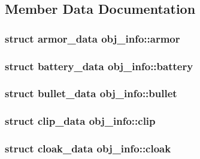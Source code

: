 \subsection{Member Data Documentation}
\hypertarget{unionobj__info_a552fc4f7734bc659341b5fd857a4aa11}{
\subsubsection[{armor}]{\setlength{\rightskip}{0pt plus 5cm}struct {\bf armor\-\_\-data} obj\-\_\-info\-::armor}}\label{unionobj__info_a552fc4f7734bc659341b5fd857a4aa11}
\hypertarget{unionobj__info_a309b79c3adbc4e1fa3afa0b53c1a08bb}{
\subsubsection[{battery}]{\setlength{\rightskip}{0pt plus 5cm}struct {\bf battery\-\_\-data} obj\-\_\-info\-::battery}}\label{unionobj__info_a309b79c3adbc4e1fa3afa0b53c1a08bb}
\hypertarget{unionobj__info_acf2324b3d090ccafc9bf528a2165cabc}{
\subsubsection[{bullet}]{\setlength{\rightskip}{0pt plus 5cm}struct {\bf bullet\-\_\-data} obj\-\_\-info\-::bullet}}\label{unionobj__info_acf2324b3d090ccafc9bf528a2165cabc}
\hypertarget{unionobj__info_acc99009097df8afe28a196266eb1624c}{
\subsubsection[{clip}]{\setlength{\rightskip}{0pt plus 5cm}struct {\bf clip\-\_\-data} obj\-\_\-info\-::clip}}\label{unionobj__info_acc99009097df8afe28a196266eb1624c}
\hypertarget{unionobj__info_aa90c655fc6e7875a67dd4594ac93271b}{
\subsubsection[{cloak}]{\setlength{\rightskip}{0pt plus 5cm}struct {\bf cloak\-\_\-data} obj\-\_\-info\-::cloak}}\label{unionobj__info_aa90c655fc6e7875a67dd4594ac93271b}
